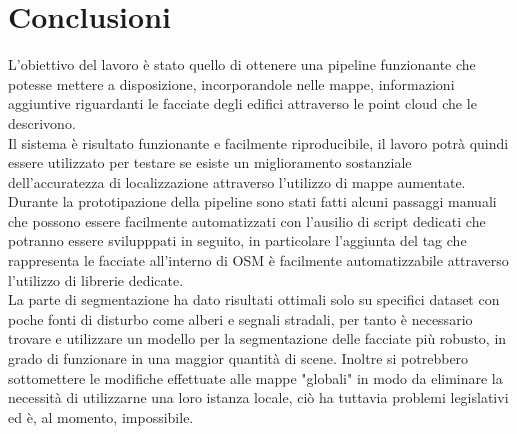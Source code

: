 \chapter{Conclusioni}
\label{cap:Conclusioni}
L'obiettivo del lavoro è stato quello di ottenere una pipeline funzionante che potesse mettere a disposizione, incorporandole nelle mappe, informazioni aggiuntive riguardanti le facciate degli edifici attraverso le point cloud che le descrivono.\\
Il sistema è risultato funzionante e facilmente riproducibile, il lavoro potrà quindi essere utilizzato per testare se esiste un miglioramento sostanziale dell'accuratezza di localizzazione attraverso l'utilizzo di mappe aumentate. Durante la prototipazione della pipeline sono stati fatti alcuni passaggi manuali che possono essere facilmente automatizzati con l'ausilio di script dedicati che potranno essere svilupppati in seguito, in particolare l'aggiunta del tag che rappresenta le facciate all'interno di OSM è facilmente automatizzabile attraverso l'utilizzo di librerie dedicate.\\
La parte di segmentazione ha dato risultati ottimali solo su specifici dataset con poche fonti di disturbo come alberi e segnali stradali, per tanto è necessario trovare e utilizzare un modello per la segmentazione delle facciate più robusto, in grado di funzionare in una maggior quantità di scene. 
Inoltre si potrebbero sottomettere le modifiche effettuate alle mappe "globali" in modo da eliminare la necessità di utilizzarne una loro istanza locale, ciò ha tuttavia problemi legislativi ed è, al momento, impossibile.

